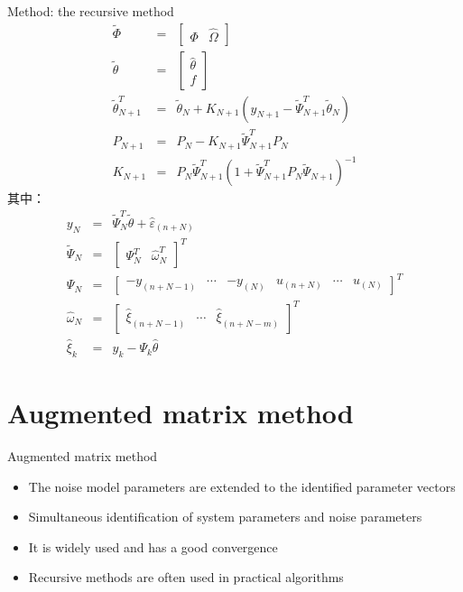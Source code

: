 \begin{frame}{ Method: the recursive method }
\begin{eqnarray*}
\tilde\Phi &=&\begin{bmatrix}\Phi & \hat\Omega\end{bmatrix} \\
\tilde\theta &=&\begin{bmatrix}\hat\theta \\ f \end{bmatrix} \\
\tilde\theta_{N+1}^T &=& \tilde\theta_N + K_{N+1} (y_{N+1}-\tilde\Psi_{N+1}^T\tilde\theta_N) \\
P_{N+1} &=& P_N -K_{N+1}\tilde\Psi_{N+1}^T P_N \\
K_{N+1} &=& P_N \tilde\Psi_{N+1}^T (1+\tilde\Psi_{N+1}^T P_N \tilde\Psi_{N+1})^{-1}
\end{eqnarray*}
其中：
\begin{eqnarray*}
y_{N} &=& \tilde \Psi_N^T\tilde\theta + \hat\varepsilon_{(n+N)} \\
\tilde\Psi_N &=&\begin{bmatrix}\Psi_N^T & \hat\omega_N^T \end{bmatrix}^T \\
\Psi_N &=& \begin{bmatrix} -y_{(n+N-1)} & \cdots & -y_{(N)} & u_{(n+N)} &\cdots & u_{(N)} \end{bmatrix}^T \\
\hat\omega_N &=&\begin{bmatrix} \hat\xi_{(n+N-1)} & \cdots & \hat\xi_{(n+N-m)} \end{bmatrix}^T \\
\hat\xi_k &=& y_k-\Psi_k \hat\theta
\end{eqnarray*}
\end{frame}

\section{ Augmented matrix method }
\begin{frame}{ Augmented matrix method }
\begin{itemize}
\item   The noise model parameters are extended to the identified parameter vectors 
\item   Simultaneous identification of system parameters and noise parameters 
\item   It is widely used and has a good convergence 
\item   Recursive methods are often used in practical algorithms 
\end{itemize}
\end{frame}

